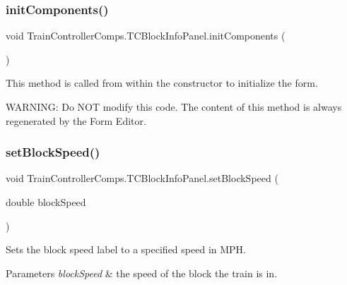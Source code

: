 \subsubsection{\texorpdfstring{init\+Components()}{initComponents()}}
{\footnotesize\ttfamily void Train\+Controller\+Comps.\+T\+C\+Block\+Info\+Panel.\+init\+Components (\begin{DoxyParamCaption}{ }\end{DoxyParamCaption})\hspace{0.3cm}{\ttfamily [private]}}



This method is called from within the constructor to initialize the form. 

W\+A\+R\+N\+I\+NG\+: Do N\+OT modify this code. The content of this method is always regenerated by the Form Editor. \mbox{\label{classTrainControllerComps_1_1TCBlockInfoPanel_a2579f1bf5addf760f020e222f831b35a}} 
\subsubsection{\texorpdfstring{set\+Block\+Speed()}{setBlockSpeed()}}
{\footnotesize\ttfamily void Train\+Controller\+Comps.\+T\+C\+Block\+Info\+Panel.\+set\+Block\+Speed (\begin{DoxyParamCaption}\item[{double}]{block\+Speed }\end{DoxyParamCaption})}



Sets the block speed label to a specified speed in M\+PH. 


\begin{DoxyParams}{Parameters}
{\em block\+Speed} & the speed of the block the train is in. \\
\hline
\end{DoxyParams}
\mbox{\label{classTrainControllerComps_1_1TCBlockInfoPanel_a930f11785e7efa17ccc8909d885de1c5}} 
